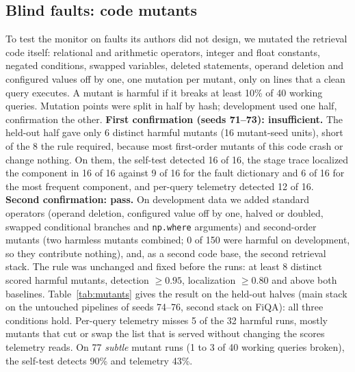 \documentclass[conference]{IEEEtran}
\begin{document}
\subsection{Blind faults: code mutants}\label{sec:res-mutants}
To test the monitor on faults its authors did not design, we mutated the retrieval code itself: relational and arithmetic operators, integer and float constants, negated conditions, swapped variables, deleted statements, operand deletion and configured values off by one, one mutation per mutant, only on lines that a clean query executes. A mutant is harmful if it breaks at least 10\% of 40 working queries. Mutation points were split in half by hash; development used one half, confirmation the other. \textbf{First confirmation (seeds 71--73): insufficient.} The held-out half gave only 6 distinct harmful mutants (16 mutant-seed units), short of the 8 the rule required, because most first-order mutants of this code crash or change nothing. On them, the self-test detected 16 of 16, the stage trace localized the component in 16 of 16 against 9 of 16 for the fault dictionary and 6 of 16 for the most frequent component, and per-query telemetry detected 12 of 16. \textbf{Second confirmation: pass.} On development data we added standard operators (operand deletion, configured value off by one, halved or doubled, swapped conditional branches and \texttt{np.where} arguments) and second-order mutants (two harmless mutants combined; 0 of 150 were harmful on development, so they contribute nothing), and, as a second code base, the second retrieval stack. The rule was unchanged and fixed before the runs: at least 8 distinct scored harmful mutants, detection $\ge0.95$, localization $\ge0.80$ and above both baselines. Table~\ref{tab:mutants} gives the result on the held-out halves (main stack on the untouched pipelines of seeds 74--76, second stack on FiQA): all three conditions hold. Per-query telemetry misses 5 of the 32 harmful runs, mostly mutants that cut or swap the list that is served without changing the scores telemetry reads. On 77 \emph{subtle} mutant runs (1 to 3 of 40 working queries broken), the self-test detects 90\% and telemetry 43\%.
\end{document}
